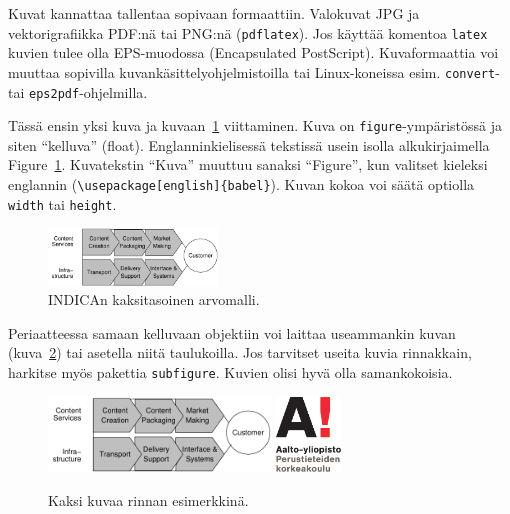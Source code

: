 Kuvat kannattaa tallentaa sopivaan formaattiin. Valokuvat JPG
ja vektorigrafiikka PDF:nä tai PNG:nä (\verb!pdflatex!).
Jos käyttää komentoa \verb!latex! kuvien tulee olla EPS-muodossa 
(Encapsulated PostScript). Kuvaformaattia voi muuttaa sopivilla
kuvankäsittelyohjelmistoilla tai Linux-koneissa esim. 
 \verb!convert!- tai \verb!eps2pdf!-ohjelmilla.

Tässä ensin yksi kuva ja kuvaan~\ref{fig:indica_model} viittaminen.
Kuva on \verb!figure!-ympäristössä ja siten ``kelluva'' (float).
Englanninkielisessä tekstissä usein isolla alkukirjaimella
Figure~\ref{fig:indica_model}. Kuvatekstin ``Kuva'' muuttuu
sanaksi ``Figure'', kun valitset kieleksi englannin 
(\verb!\usepackage[english]{babel}!). Kuvan kokoa voi säätä
optiolla \verb!width! tai \verb!height!.

\begin{figure}[htb]
  \begin{center}
    \includegraphics[width=0.4\textwidth]{indica_model}
    \caption{INDICAn kaksitasoinen arvomalli.}
    \label{fig:indica_model}
  \end{center}
\end{figure}

Periaatteessa samaan kelluvaan objektiin voi laittaa useammankin kuvan
(kuva~\ref{fig:tuplat}) tai asetella niitä taulukoilla.
Jos tarvitset useita kuvia rinnakkain, harkitse
myös pakettia \verb!subfigure!. Kuvien olisi hyvä olla samankokoisia.

\begin{figure}[htb]
  \begin{center}
    \includegraphics[height=20mm]{indica_model}
    \hspace{10mm}  %
    \includegraphics[height=20mm]{AaltoSCI_FI_1}
    \caption{Kaksi kuvaa rinnan esimerkkinä.}
    \label{fig:tuplat}
  \end{center}
\end{figure}

